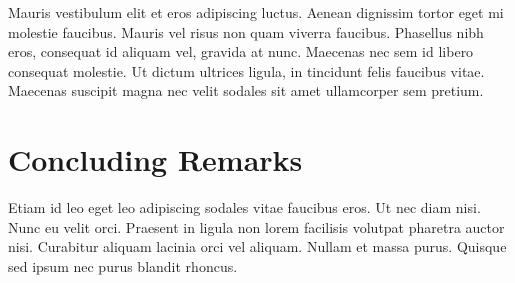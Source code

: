 \documentclass[letterpaper,11pt]{article}
\begin{document}
Mauris vestibulum elit et eros adipiscing luctus. Aenean dignissim
tortor eget mi molestie faucibus. Mauris vel risus non quam viverra
faucibus. Phasellus nibh eros, consequat id aliquam vel, gravida at
nunc. Maecenas nec sem id libero consequat molestie. Ut dictum
ultrices ligula, in tincidunt felis faucibus vitae. Maecenas suscipit
magna nec velit sodales sit amet ullamcorper sem pretium.

\section*{Concluding Remarks}
Etiam id leo eget leo adipiscing sodales vitae faucibus eros. Ut nec
diam nisi. Nunc eu velit orci. Praesent in ligula non lorem facilisis
volutpat pharetra auctor nisi. Curabitur aliquam lacinia orci vel
aliquam. Nullam et massa purus. Quisque sed ipsum nec purus blandit
rhoncus.
\end{document}
